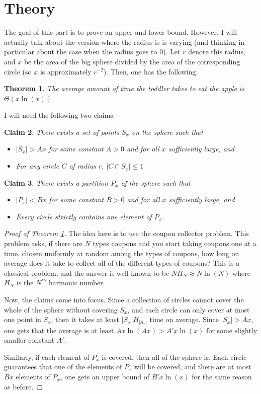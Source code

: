 \documentclass[11pt]{article}
\newtheorem{theorem}{Theorem}
\newtheorem{claim}[theorem]{Claim}
\theoremstyle{definition}
\begin{document}
\section{Theory}
The goal of this part is to prove an upper and lower bound.  However, I will actually talk about the version where the radius is is varying (and thinking in particular about the case when the radius goes to $0$).  Let $r$ denote this radius, and $x$ be the area of the big sphere divided by the area of the corresponding circle (so $x$ is approximately $r^{-2}$).  Then, one has the following:
\begin{theorem}\label{MainTheorem}
The average amount of time the toddler takes to eat the apple is $\Theta(x\ln(x))$.
\end{theorem}
I will need the following two claims:
\begin{claim}\label{CoarseMesh}
There exists a set of points $S_x$ on the sphere such that
\begin{itemize}
\item $|S_x| > Ax$ for some constant $A > 0$ and for all $x$ sufficiently large, and
\item For any circle $C$ of radius $r$, $|C \cap S_x| \leq 1$
\end{itemize}
\end{claim}
\begin{claim}\label{FineMesh}
There exists a partition $P_x$ of the sphere such that
\begin{itemize}
\item $|P_x| < Bx$ for some constant $B > 0$ and for all $x$ sufficiently large, and
\item Every circle strictly contains one element of $P_x$.
\end{itemize}
\end{claim}
\begin{proof}[Proof of Theorem \ref{MainTheorem}]
The idea here is to use the coupon collector problem.  This problem asks, if there are $N$ types coupons and you start taking coupons one at a time, chosen uniformly at random among the types of coupons, how long on average does it take to collect all of the different types of coupons?  This is a classical problem, and the answer is well known to be $NH_N \approx N\ln(N)$ where $H_N$ is the $N^{th}$ harmonic number.

Now, the claims come into focus.  Since a collection of circles cannot cover the whole of the sphere without covering $S_x$, and each circle can only cover at most one point in $S_x$, then it takes at least $|S_x|H_{|S_x|}$ time on average.  Since $|S_x| > Ax$, one gets that the average is at least $Ax\ln(Ax) > A'x\ln(x)$ for some slightly smaller constant $A'$.

Similarly, if each element of $P_x$ is covered, then all of the sphere is.  Each circle guarantees that one of the elements of $P_x$ will be covered, and there are at most $Bx$ elements of $P_x$, one gets an upper bound of $B'x\ln(x)$ for the same reason as before.

\end{proof}
\end{document}
